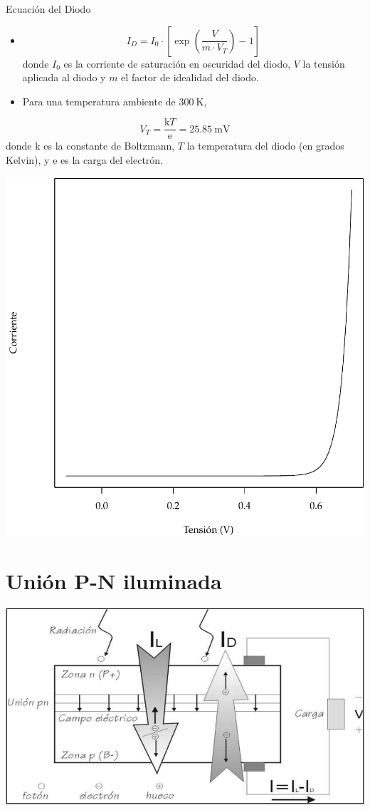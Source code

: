 \documentclass[xcolor={usenames,svgnames,dvipsnames}]{beamer}
\begin{document}
\begin{frame}[label=sec-1-5-2]{Ecuación del Diodo}
\begin{itemize}
\item $$I_{D}=I_{0}\cdot[\exp(\frac{V}{m\cdot V_{T}})-1]$$ donde $I_{0}$ es la corriente de saturación en oscuridad del diodo, $V$ la tensión aplicada al diodo y $m$ el factor de idealidad del diodo.

\item Para una temperatura ambiente de $\SI{300}{\kelvin}$,
\end{itemize}
$$V_{T}=\frac{\mathrm{k}T}{\mathrm{e}}=\SI{25.85}{\milli\volt}$$ donde
$\mathrm{k}$ es la constante de Boltzmann, $T$ la temperatura del diodo
(en grados Kelvin), y $\mathrm{e}$ es la carga del electrón.
\end{frame}

\begin{frame}[label=sec-1-5-3]{}
\includegraphics[width=.9\linewidth]{../figs/EcuacionDiodo.pdf}
\end{frame}


\section{Unión P-N iluminada}
\label{sec-2}

\begin{frame}[label=sec-2-0-1]{}
\includegraphics[width=.9\linewidth]{../figs/CelulaSolar.pdf}
\end{frame}
\end{document}
